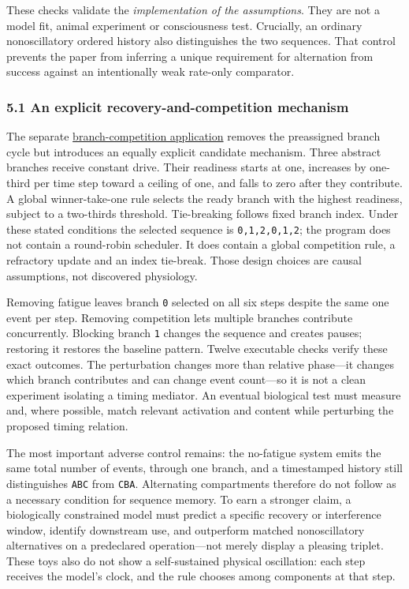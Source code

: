 \documentclass[
  american,
  11pt,
  letterpaper,
]{article}
\begin{document}
These checks validate the \emph{implementation of the assumptions}. They are not a model fit, animal experiment or consciousness test. Crucially, an ordinary nonoscillatory ordered history also distinguishes the two sequences. That control prevents the paper from inferring a unique requirement for alternation from success against an intentionally weak rate-only comparator.

\subsubsection{5.1 An explicit recovery-and-competition mechanism}\label{an-explicit-recovery-and-competition-mechanism}

The separate \href{https://github.com/v5ma/v5ma.github.io/blob/f6d3867df89ae9dea32f763b1d55c84212c41cc6/papers/companions/five-papers-20260923/temporal/paper/applications/branch-competition-v02/README.md}{branch-competition application} removes the preassigned branch cycle but introduces an equally explicit candidate mechanism. Three abstract branches receive constant drive. Their readiness starts at one, increases by one-third per time step toward a ceiling of one, and falls to zero after they contribute. A global winner-take-one rule selects the ready branch with the highest readiness, subject to a two-thirds threshold. Tie-breaking follows fixed branch index. Under these stated conditions the selected sequence is \texttt{0,1,2,0,1,2}; the program does not contain a round-robin scheduler. It does contain a global competition rule, a refractory update and an index tie-break. Those design choices are causal assumptions, not discovered physiology.

Removing fatigue leaves branch \texttt{0} selected on all six steps despite the same one event per step. Removing competition lets multiple branches contribute concurrently. Blocking branch \texttt{1} changes the sequence and creates pauses; restoring it restores the baseline pattern. Twelve executable checks verify these exact outcomes. The perturbation changes more than relative phase---it changes which branch contributes and can change event count---so it is not a clean experiment isolating a timing mediator. An eventual biological test must measure and, where possible, match relevant activation and content while perturbing the proposed timing relation.

The most important adverse control remains: the no-fatigue system emits the same total number of events, through one branch, and a timestamped history still distinguishes \texttt{ABC} from \texttt{CBA}. Alternating compartments therefore do not follow as a necessary condition for sequence memory. To earn a stronger claim, a biologically constrained model must predict a specific recovery or interference window, identify downstream use, and outperform matched nonoscillatory alternatives on a predeclared operation---not merely display a pleasing triplet. These toys also do not show a self-sustained physical oscillation: each step receives the model's clock, and the rule chooses among components at that step.
\end{document}
